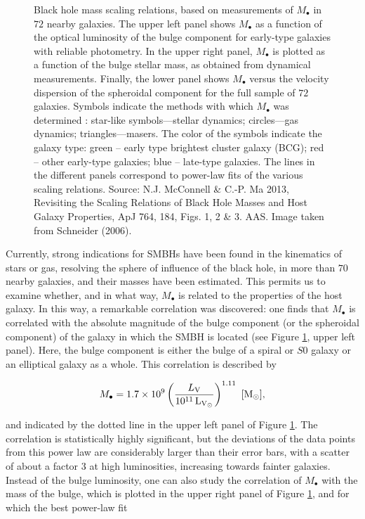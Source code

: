 \documentclass[a4paper,11pt]{article}
\begin{document}
\begin{figure}[t!]
    \caption{\footnotesize{Black hole mass scaling relations, based on measurements of $M_\bullet$ in $72$ nearby galaxies. The upper left panel shows $M_\bullet$ as a function of the optical luminosity of the bulge component for early-type galaxies with reliable photometry. In the upper right panel, $M_\bullet$ is plotted as a function of the bulge stellar mass, as obtained from dynamical measurements. Finally, the lower panel shows $M_\bullet$ versus the velocity dispersion of the spheroidal component for the full sample of $72$ galaxies. Symbols indicate the methods with which $M_\bullet$ was determined : star-like symbols—stellar dynamics; circles—gas dynamics; triangles—masers. The color of the symbols indicate the galaxy type: green -- early type brightest cluster galaxy (BCG); red -- other early-type galaxies; blue -- late-type galaxies. The lines in the different panels correspond to power-law fits of the various scaling relations. Source: N.J. McConnell \& C.-P. Ma 2013, Revisiting the Scaling Relations of Black Hole Masses and Host Galaxy Properties, ApJ 764, 184, Figs. 1, 2 \& 3. AAS. Image taken from Schneider (2006).}}
    \label{fig:bhcorrelations}
\end{figure}

{\noindent}Currently, strong indications for SMBHs have been found in the kinematics of stars or gas, resolving the sphere of influence of the black hole, in more than $70$ nearby galaxies, and their masses have been estimated. This permits us to examine whether, and in what way, $M_\bullet$ is related to the properties of the host galaxy. In this way, a remarkable correlation was discovered: one finds that $M_\bullet$ is correlated with the absolute magnitude of the bulge component (or the spheroidal component) of the galaxy in which the SMBH is located (see Figure \ref{fig:bhcorrelations}, upper left panel). Here, the bulge component is either the bulge of a spiral or $S0$ galaxy or an elliptical galaxy as a whole. This correlation is described by

\begin{align*}
    M_\bullet = 1.7\times10^9\left(\frac{L_\mathrm{V}}{10^{11}\,{\rm L_{V_\odot}}}\right)^{1.11} ~ [{\rm M_\odot}],
\end{align*}

{\noindent}and indicated by the dotted line in the upper left panel of Figure \ref{fig:bhcorrelations}. The correlation is statistically highly significant, but the deviations of the data points from this power law are considerably larger than their error bars, with a scatter of about a factor $3$ at high luminosities, increasing towards fainter galaxies. Instead of the bulge luminosity, one can also study the correlation of $M_\bullet$ with the mass of the bulge, which is plotted in the upper right panel of Figure \ref{fig:bhcorrelations}, and for which the best power-law fit
\end{document}
